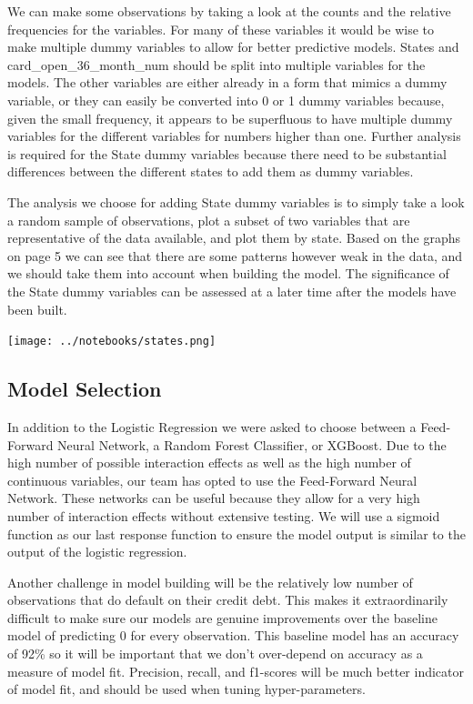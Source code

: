 \documentclass[12pt]{article}
\begin{document}
	We can make some observations by taking a look at the counts and the relative frequencies for the variables. For many of these variables it would be wise 
to make multiple dummy variables to allow for better predictive models. States and card\_open\_36\_month\_num should be split into multiple variables for the models. The other variables are either already in a form that mimics a dummy variable, or they can easily be converted into 0 or 1 dummy variables because, given the small frequency, it appears to be superfluous to have multiple dummy variables for the different variables for numbers higher than one. Further analysis is required for the State dummy variables because there need to be substantial differences between the different states to add them as dummy variables. 
	
	The analysis we choose for adding State dummy variables is to simply take a look a random sample of observations, plot a subset of two variables that are representative of the data available, and plot them by state. Based on the graphs on page 5 we can see that there are some patterns however weak in the data, and we should take them into account when building the model. The significance of the State dummy variables can be assessed at a later time after the models have been built. 
	
	\begin{center}
		\texttt{[image: ../notebooks/states.png]}	
	\end{center}
	
	\subsection{Model Selection}
	
	In addition to the Logistic Regression we were asked to choose between a Feed-Forward Neural Network, a Random Forest Classifier, or XGBoost. Due to the high number of possible interaction effects as well as the high number of continuous variables, our team has opted to use the Feed-Forward Neural Network. These networks can be useful because they allow for a very high number of interaction effects without extensive testing. We will use a sigmoid function as our last response function to ensure the model output is similar to the output of the logistic regression.
	
	Another challenge in model building will be the relatively low number of observations that do default on their credit debt. This makes it extraordinarily difficult to make sure our models are genuine improvements over the baseline model of predicting 0 for every observation. This baseline model has an accuracy of 92\% so it will be important that we don't over-depend on accuracy as a measure of model fit. Precision, recall, and f1-scores will be much better indicator of model fit, and should be used when tuning hyper-parameters. 
	
\end{document}
